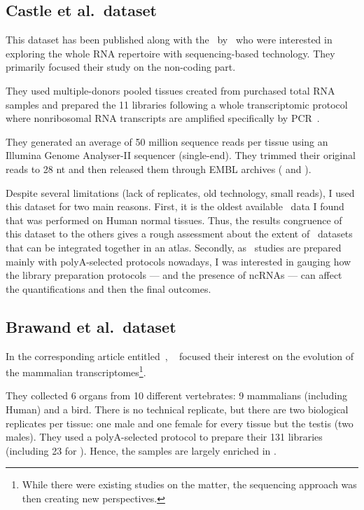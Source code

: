 \subsection{Castle et al.\ dataset}
\label{subsec:castlepresentation}
This dataset has been published along with the~
by~\citet{castleData} who were interested in exploring the whole RNA repertoire
with sequencing-based technology. They primarily focused their study
on the non-coding part.

They used multiple-donors pooled tissues created from purchased total \gls{RNA}
samples and prepared the 11 libraries following a whole transcriptomic protocol
where nonribosomal \gls{RNA} transcripts are
amplified specifically by \gls{PCR}~.

They generated an average of 50 million sequence reads per tissue
using an Illumina Genome Analyser-II sequencer (single-end).
They trimmed their original reads to 28 \gls{nt}
and then released them through EMBL archives (
and ).

Despite several limitations (lack of replicates, old technology, small reads),
I used this dataset for two main reasons. First, it is the oldest available
\Rnaseq\ data I found that was performed on Human normal tissues. Thus, the
results congruence of this dataset to the others gives a rough assessment about
the extent of \Rnaseq\ datasets that can be integrated together in an atlas.
Secondly, as \Rnaseq\ studies are prepared mainly with polyA-selected protocols
nowadays, I was interested in gauging how the library preparation
protocols --- and the presence of \glspl{ncRNA} --- can affect the
quantifications and then the final outcomes.


\subsection{Brawand et al.\ dataset}
\label{subsec:brawandpresentation}
In the corresponding article entitled~,%
~\citet{VTpaper} focused their interest on the
evolution of the mammalian transcriptomes\footnote{While there were existing
studies on the matter, the sequencing approach was then creating new perspectives.}.

They collected 6 organs from 10 different vertebrates:
9 mammalians (including Human) and a bird. There is no technical replicate,
but there are two biological replicates per tissue:
one male and one female for every tissue but the testis (two males).
They used a polyA-selected protocol to prepare their 131 libraries (including 23
for ).
Hence, the samples are largely enriched in \pcgs.

